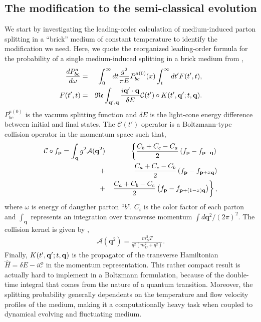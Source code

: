 \documentclass[aps, prc, reprint, amsmath, groupedaddress, nofootinbib]{revtex4-1}
\begin{document}
\subsection{The modification to the semi-classical evolution}
We start by investigating the leading-order calculation of medium-induced parton splitting in a ``brick'' medium of constant temperature to identify the modification we need.
Here, we quote the reorganized leading-order formula for the probability of a single medium-induced splitting in a brick medium from \cite{Zakharov:1996fv,CaronHuot:2010bp},
\begin{eqnarray}
\frac{dP^{a}_{bc}}{d\omega} &=& \int_0^\infty dt \frac{g^2}{\pi E} P_{bc}^{a(0)}(x) \int_t^\infty dt'  F(t', t),
\label{eq:full-theory}
\\
F(t', t) &=& \mathfrak{Re} \int_{{\bf q}', {\bf q}} \frac{i {\bf q}'\cdot {\bf q}}{\delta E} \mathcal{C}(t') \circ K(t', {\bf q}'; t, {\bf q}).
\end{eqnarray}
$P_{bc}^{a(0)}$ is the vacuum splitting function and $\delta E$ is the light-cone energy difference between initial and final states. 
The $\mathcal{C}(t')$ operator is a Boltzmann-type collision operator in the momentum space such that,
\begin{eqnarray}
\mathcal{C}\circ f_{\mathbf{p}} = \int_{\bf q} g^2\mathcal{A}(\mathbf{q}^2)
&&\left\{  \frac{C_b+C_c-C_a}{2}\left(f_{\bf p}-f_{{\bf p}-{\bf q}}\right) \right.\\\nonumber
 +&&    \frac{C_a+C_c-C_b}{2}\left(f_{\bf p}-f_{{\bf p}+x{\bf q}}\right) \\\nonumber
+&&  \left. \frac{C_a+C_b-C_c}{2}\left(f_{\bf p}-f_{{\bf p}+(1-x){\bf q}}\right)\right\},
\end{eqnarray}
where $\omega$ is energy of daugther parton ``$b$''.
$C_i$ is the color factor of each parton and $\int_{\mathbf{q}}$ represents an integration over transverse momentum $\int d\mathbf{q}^2/(2\pi)^2$.
The collision kernel is given by \cite{Aurenche:2002pd},
\begin{eqnarray}
\mathcal{A}(\mathbf{q}^2) = \frac{m_D^2 T}{q^2\left(m_D^2+q^2\right)}.
\label{eq:kernel}
\end{eqnarray}
Finally, $K(t', {\bf q}'; t, {\bf q})$ is the propagator of the transverse  Hamiltonian $\hat{H} = \delta E - i\mathcal{C}$ in the momentum representation.
This rather compact result is actually hard to implement in a Boltzmann formulation, because of the double-time integral that comes from the nature of a quantum transition.
Moreover, the splitting probability generally dependents on the temperature and flow velocity profiles of the medium, making it a computationally heavy task when coupled to dynamical evolving and fluctuating medium.
\end{document}

